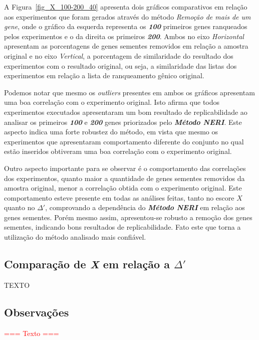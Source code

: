 %
A Figura~\ref{fig_X_100-200_40} apresenta dois gráficos comparativos em relação aos experimentos que foram gerados através do método \textsl{Remoção de mais de um gene}, onde o gráfico da esquerda representa os \textsl{\textbf{100}} primeiros genes ranqueados pelos experimentos e o da direita os primeiros \textsl{\textbf{200}}. Ambos no eixo \textsl{Horizontal} apresentam as porcentagens de genes sementes removidos em relação a amostra original e no eixo \textsl{Vertical}, a porcentagem de similaridade do resultado dos experimentos com o resultado original, ou seja, a similaridade das listas dos experimentos em relação a lista de ranqueamento gênico original.
%

%
Podemos notar que mesmo os \textsl{outliers} presentes em ambos os gráficos apresentam uma boa correlação com o experimento original. Isto afirma que todos experimentos executados apresentaram um bom resultado de replicabilidade ao analisar os primeiros \textbf{\textsl{100}} e \textbf{\textsl{200}} genes priorizados pelo \textbf{\textsl{Método NERI}}. Este aspecto indica uma forte robustez do método, em vista que mesmo os experimentos que apresentaram comportamento diferente do conjunto no qual estão inseridos obtiveram uma boa correlação com o experimento original.

%
Outro aspecto importante para se observar é o comportamento das correlações dos experimentos, quanto maior a quantidade de genes sementes removidos da amostra original, menor a correlação obtida com o experimento original. Este comportamento esteve presente em todas as análises feitas, tanto no escore $X$ quanto no $\Delta'$, comprovando a dependência do \textbf{\textsl{Método NERI}} em relação aos genes sementes. Porém mesmo assim, apresentou-se robusto a remoção dos genes sementes, indicando bons resultados de replicabilidade. Fato este que torna a utilização do método analisado mais confiável. 
%

%
\subsection{Comparação de \textit{X} em relação a $\Delta'$}
%



TEXTO
%

%
%

\subsection{Observações}
%
\textcolor{red}{=== Texto ===}

